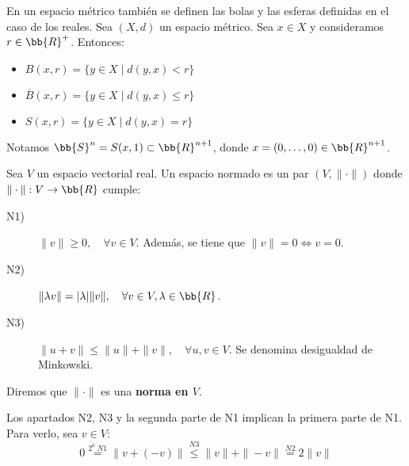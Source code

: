 En un espacio métrico también se definen las bolas y las esferas definidas en el caso de los reales. Sea $(X,d)$ un espacio métrico. Sea $x\in X$ y consideramos $r\in \bb{R}^+$. Entonces:
\begin{itemize}
    \item $B(x,r) = \{y\in X \mid d(y,x)<r\}$
    \item $\overline{B}(x,r) = \{y\in X \mid d(y,x)\leq r\}$
    \item $S(x,r) = \{y\in X \mid d(y,x)=r\}$
\end{itemize}

\begin{notacion}
    Notamos $\bb{S}^n=S(x,1)\subset \bb{R}^{n+1}$, donde $x=(0,\dots,0)\in \bb{R}^{n+1}$.
\end{notacion}


\begin{definicion}
    Sea $V$ un espacio vectorial real. Un espacio normado es un par $(V,\|\cdot\|)$ donde $\|\cdot\|:V\to \bb{R}$ cumple:
    \begin{description}
        \item[N1)] $\|v\|\geq 0, \quad \forall v\in V$. Además, se tiene que $\|v\|=0\Longleftrightarrow v=0$.

        \item[N2)] $\|\lambda v\| = |\lambda|\|v\|, \quad \forall v\in V, \lambda\in \bb{R}$.

        \item[N3)] $\|u+v\|\leq \|u\|+\|v\|,\quad \forall u,v\in V$. Se denomina desigualdad de Minkowski.
    \end{description}
    Diremos que $\|\cdot\|$ es una \textbf{norma en $V$}.
\end{definicion}

\begin{observacion}
    Los apartados N2, N3 y la segunda parte de N1 implican la primera parte de N1. Para verlo, sea $v\in V$:
    \begin{equation*}
        0\stackrel{2^a~N1}{=} \|v+(-v)\| \stackrel{N3}\leq \|v\|+\|-v\| \stackrel{N2}{=} 2\|v\|
    \end{equation*}
\end{observacion}

